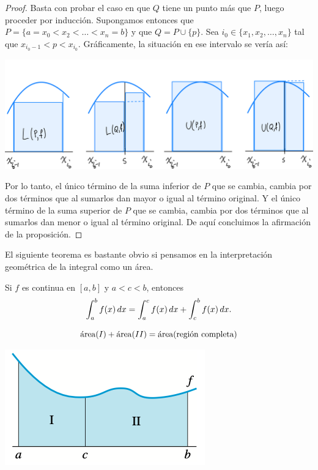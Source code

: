 \begin{proof}
  Basta con probar el caso en que $Q$ tiene un punto más que $P$, luego proceder por inducción.
  Supongamos entonces que $P=\{a=x_0<x_2<\dots<x_n=b\}$ y que $Q = P\cup \{p\}$. Sea $i_0\in\{x_1,x_2,\dots,x_n\}$ tal que $x_{i_0-1}<p<x_{i_0}$.
  Gráficamente, la situación en ese intervalo se vería así:

  \centerline{\includegraphics[width=.8\textwidth]{pics/sumas-insertar-punto.png}}

  Por lo tanto, el único término de la suma inferior de $P$ que se cambia, cambia por dos términos que al sumarlos dan mayor o igual al término original.
  Y el único término de la suma superior de $P$ que se cambia, cambia por dos términos que al sumarlos dan menor o igual al término original. 
  De aquí concluimos la afirmación de la proposición.
\end{proof}

El siguiente teorema es bastante obvio si pensamos en la interpretación geométrica de la integral como un área.

\begin{theorem}
  Si $f$ es continua en $[a,b]$ y $a<c<b$, entonces
  \[
  \int_a^b f(x)\,dx = \int_a^c f(x)\,dx + \int_c^b f(x)\,dx.
  \]
\end{theorem}

\noindent
\begin{minipage}{.6\textwidth}
  \[ \mathrm{\protect\acute{a}rea}(I)+\mathrm{\protect\acute{a}rea}(II)=\mathrm{\protect\acute{a}rea}(\text{región completa})\]
\end{minipage}
\begin{minipage}{.39\textwidth}
\centerline{\includegraphics[width=.8\textwidth]{pics/integral-suma-intervalos.png}}
\end{minipage}


